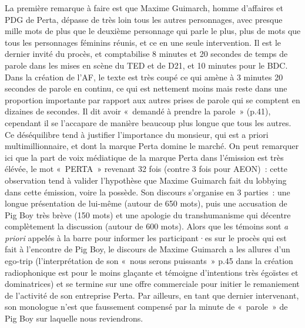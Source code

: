 \documentclass[
]{article}
\begin{document}
La première remarque à faire est que Maxime Guimarch, homme d'affaires et PDG de Perta, dépasse de très loin tous les autres personnages, avec presque mille mots de plus que le deuxième personnage qui parle le plus, plus de mots que tous les personnages féminins réunis, et ce en une seule intervention. Il est le dernier invité du procès, et comptabilise 8 minutes et 20 secondes de temps de parole dans les mises en scène du TED et de D21, et 10 minutes pour le BDC. Dans la création de l'AF, le texte est très coupé ce qui amène à 3 minutes 20 secondes de parole en continu, ce qui est nettement moins mais reste dans une proportion importante par rapport aux autres prises de parole qui se comptent en dizaines de secondes. Il dit avoir «~demandé à prendre la parole~» (p.41), cependant il se l'accapare de manière beaucoup plus longue que tous les autres. Ce déséquilibre tend à justifier l'importance du monsieur, qui est a priori multimillionnaire, et dont la marque Perta domine le marché. On peut remarquer ici que la part de voix médiatique de la marque Perta dans l'émission est très élévée, le mot «~PERTA~» revenant 32 fois (contre 3 fois pour AEON)~: cette observation tend à valider l'hypothèse que Maxime Guimarch fait du lobbying dans cette émission, voire la possède. Son discours s'organise en 3 parties~: une longue présentation de lui-même (autour de 650 mots), puis une accusation de Pig Boy très brève (150 mots) et une apologie du transhumanisme qui décentre complètement la discussion (autour de 600 mots). Alors que les témoins sont \emph{a priori} appelés à la barre pour informer les participant·es sur le procès qui est fait à l'encontre de Pig Boy, le discours de Maxime Guimarch a les allures d'un ego-trip (l'interprétation de son «~nous serons puissants~» p.45 dans la création radiophonique est pour le moins glaçante et témoigne d'intentions très égoïstes et dominatrices) et se termine sur une offre commerciale pour initier le remaniement de l'activité de son entreprise Perta. Par ailleurs, en tant que dernier intervenant, son monologue n'est que faussement compensé par la minute de «~parole~» de Pig Boy sur laquelle nous reviendrons.
\end{document}

